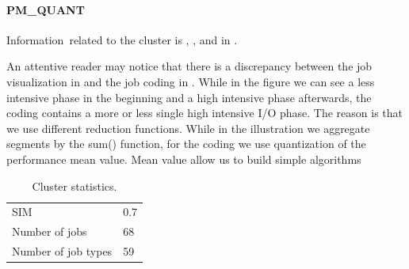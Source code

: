 \documentclass[]{llncs}
\begin{document}
\paragraph{PM\_QUANT}
Information\ related to the cluster is , , and in .

An attentive reader may notice that there is a discrepancy between the job visualization in  and the job coding in .
While in the figure we can see a less intensive phase in the beginning and a high intensive phase afterwards, the coding contains a more or less single high intensive I/O phase.
The reason is that we use different reduction functions.
While in the illustration we aggregate segments by the sum() function, for the coding we use quantization of the performance mean value.
Mean value allow us to build simple algorithms

\begin{table}
  \centering
  \begin{tabular}{ll}
    SIM & 0.7 \\
    Number of jobs & 68 \\
    Number of job types & 59 \\
  \end{tabular}
  \caption{Cluster statistics.}
  \label{tab:use_case:pm_quant:stats}
\end{table}
\end{document}
